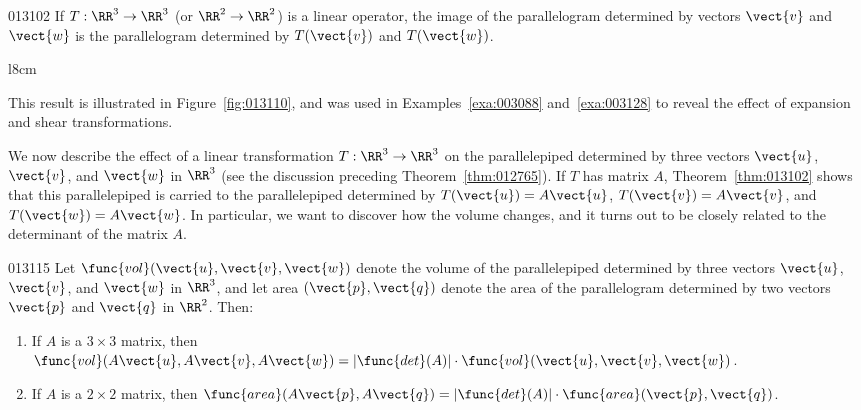 \begin{theorem}{}{013102}
If $T : \RR^3 \to \RR^3$ (or $\RR^2 \to \RR^2$) is a linear operator, the image of the parallelogram determined by vectors $\vect{v}$ and $\vect{w}$ is the parallelogram determined by $T(\vect{v})$ and $T(\vect{w})$.
\end{theorem}

\begin{wrapfigure}{l}{8cm} 
\vspace*{-2em}
\centering

\caption{\label{fig:013110}}
\end{wrapfigure}

\noindent This result is illustrated in Figure~\ref{fig:013110}, and was used in Examples~\ref{exa:003088} and~\ref{exa:003128} to reveal the effect of expansion and shear transformations.

We now describe the effect of a linear transformation $T: \RR^3 \to \RR^3$ on the parallelepiped determined by three vectors $\vect{u}$, $\vect{v}$, and $\vect{w}$ in $\RR^3$ (see the discussion preceding Theorem~\ref{thm:012765}). If $T$ has matrix $A$, Theorem~\ref{thm:013102} shows that this parallelepiped is carried to the parallelepiped determined by $T(\vect{u}) = A\vect{u}$, $T(\vect{v}) = A\vect{v}$, and $T(\vect{w}) = A\vect{w}$. In particular, we want to discover how the volume changes, and it turns out to be closely related to the determinant of the matrix $A$.

\begin{theorem}{}{013115}
Let $\func{vol}(\vect{u}, \vect{v}, \vect{w})$ denote the volume of the parallelepiped determined by three vectors $\vect{u}$, $\vect{v}$, and $\vect{w}$ in $\RR^3$, and let area $(\vect{p}, \vect{q})$ denote the area of the parallelogram determined by two vectors $\vect{p}$ and $\vect{q}$ in $\RR^2$. Then:

\begin{enumerate}
\item If $A$ is a $3 \times 3$ matrix, then $\func{vol}(A\vect{u}, A\vect{v}, A\vect{w}) = |\func{det}(A)| \cdot \func{vol}(\vect{u}, \vect{v}, \vect{w})$.

\item If $A$ is a $2 \times 2$ matrix, then $\func{area}(A\vect{p}, A\vect{q}) = |\func{det}(A)| \cdot \func{area}(\vect{p}, \vect{q})$.
\end{enumerate}
\end{theorem}



